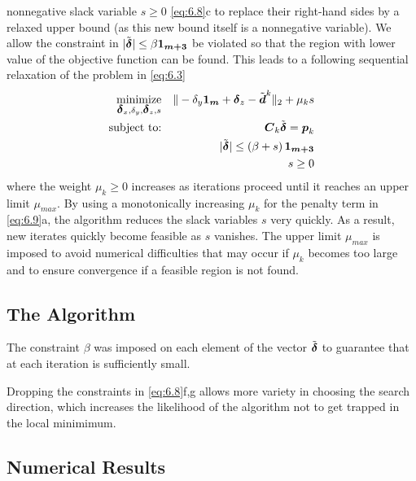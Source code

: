 nonnegative slack variable $s \geq 0$ \ref{eq:6.8}c to replace their right-hand sides  by a  relaxed upper bound (as this new bound itself is a nonnegative variable). We allow the constraint in $|\tilde{\mbox{\boldmath${\delta}$}}|  \leq \beta \mbox{\boldmath${1_{m+3}}$}$ be violated so that the  region with lower value of the objective function can be found. 
This leads to a following sequential relaxation of the problem in \ref{eq:6.3}
\begin{eqnarray} \label{eq:6.9}
\mathop{\mbox{minimize}}_{\mbox{\boldmath${\delta}$}_x, \delta_y, \mbox{\boldmath${\delta}$}_z, s}& &\| -\delta_y\mbox{\boldmath${1_m}$} + \mbox{\boldmath${\delta}$}_z - \tilde{\mbox{\boldmath$d$}}^k \|_2 + \mu_ks
\\ \nonumber
\mbox{subject to:}& &\mbox{\boldmath$C$}_k\tilde{\mbox{\boldmath${\delta}$}}  = \mbox{\boldmath$p$}_k 
\\
\nonumber
 & &|\tilde{\mbox{\boldmath${\delta}$}}|  \leq \left(\beta + s\right)\mbox{\boldmath${1_{m+3}}$} 
 \\
\nonumber
& & s \geq 0
\end{eqnarray}
where the weight $\mu_k \geq 0$ increases as iterations proceed until it reaches an upper limit
$\mu_{max}$. By using a monotonically increasing $\mu_k$ for the penalty term in \ref{eq:6.9}a, the
algorithm reduces the slack variables $s$  very quickly. As a result, new iterates
quickly become feasible as $s$  vanishes. The upper limit $\mu_{max}$ is imposed to avoid
numerical difficulties that may occur if $\mu_{k}$ becomes too large and to ensure convergence if a feasible region is not found.


\subsection{The Algorithm}
The constraint $\beta$ was imposed on each element of the vector $\tilde{\mbox{\boldmath${\delta}$}}$ to guarantee that at each iteration is sufficiently small.


Dropping the constraints in \ref{eq:6.8}f,g allows more variety in choosing the search direction, which increases the likelihood of the algorithm not to get trapped in the local minimimum.

\subsection{Numerical Results}